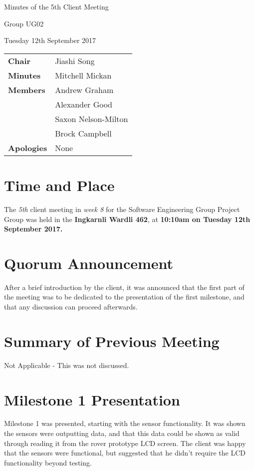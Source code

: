 \documentclass{article}
\begin{document}
\begin{center}    
{\huge Minutes of the 5th Client Meeting \par}
\vspace{0.5cm}
{\large Group UG02 \par}
\vspace{0.5cm}
{\large Tuesday 12th September 2017 \par}
\vspace{0.5cm}
\end{center}

\begin{flushleft}
\begin{tabular}{ll}
{\bfseries Chair} & Jiashi Song \\
{\bfseries Minutes} & Mitchell Mickan \\
{\bfseries Members} & Andrew Graham  \\
 & Alexander Good \\ 
 & Saxon Nelson-Milton \\
 & Brock Campbell \\
{\bfseries Apologies} & None\\
\end{tabular}
\end{flushleft}

\section{Time and Place}
The {\itshape 5th} client meeting in {\itshape week 8} for the Software Engineering Group Project Group was held in the {\bfseries Ingkarnli Wardli 462}, at {\bfseries 10:10am on Tuesday 12th September 2017.} 

\section{Quorum Announcement}
	After a brief introduction by the client, it was announced that the first part of the meeting was to be dedicated to the presentation of the first milestone, and that any discussion can proceed afterwards. 
    
\section{Summary of Previous Meeting}
 	Not Applicable - This was not discussed.

\section{Milestone 1 Presentation}
Milestone 1 was presented, starting with the sensor functionality. It was shown the sensors were outputting data, and that this data could be shown as valid through reading it from the rover prototype LCD screen. The client was happy that the sensors were functional, but suggested that he didn't require the LCD functionality beyond testing. 
\end{document}

